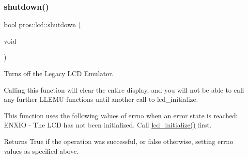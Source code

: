 \subsubsection{\texorpdfstring{shutdown()}{shutdown()}}
{\footnotesize\ttfamily bool pros\+::lcd\+::shutdown (\begin{DoxyParamCaption}\item[{void}]{ }\end{DoxyParamCaption})}



Turns off the Legacy L\+CD Emulator. 

Calling this function will clear the entire display, and you will not be able to call any further L\+L\+E\+MU functions until another call to lcd\+\_\+initialize.

This function uses the following values of errno when an error state is reached\+: E\+N\+X\+IO -\/ The L\+CD has not been initialized. Call \hyperlink{llemu_8h_ae618494f080e95b506c0c18cb1ffb407}{lcd\+\_\+initialize()} first.

\begin{DoxyReturn}{Returns}
True if the operation was successful, or false otherwise, setting errno values as specified above. 
\end{DoxyReturn}
